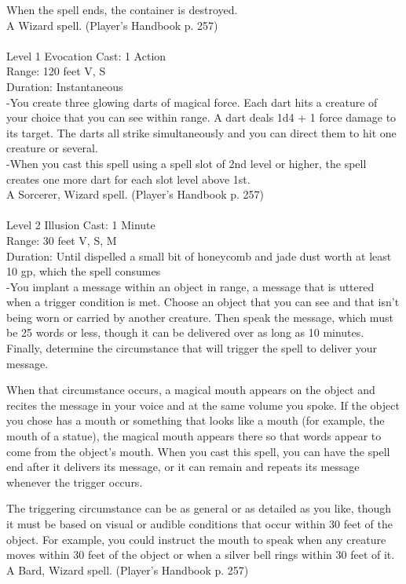 \documentclass[10pt,twocolumn]{report}
\begin{document}
When the spell ends, the container is destroyed.\\
A Wizard spell. (Player's Handbook p. 257) \\


 \\
Level 1 \quad Evocation \quad Cast: 1 Action\\
Range: 120 feet \quad V, S\\
Duration: Instantaneous \quad \\
-You create three glowing darts of magical force. Each dart hits a creature of your choice that you can see within range. A dart deals 1d4 + 1 force damage to its target. The darts all strike simultaneously and you can direct them to hit one creature or several.\\
-When you cast this spell using a spell slot of 2nd level or higher, the spell creates one more dart for each slot level above 1st.\\
A Sorcerer, Wizard spell. (Player's Handbook p. 257) \\


 \\
Level 2 \quad Illusion \quad Cast: 1 Minute\\
Range: 30 feet \quad V, S, M\\
Duration: Until dispelled \quad a small bit of honeycomb and jade dust worth at least 10 gp, which the spell consumes\\
-You implant a message within an object in range, a message that is uttered when a trigger condition is met.
Choose an object that you can see and that isn’t being worn or carried by another creature. Then speak the message, which must be 25 words or less, though it can be delivered over as long as 10 minutes. Finally, determine the circumstance that will trigger the spell to deliver your message.

When that circumstance occurs, a magical mouth appears on the object and recites the message in your voice and at the same volume you spoke. If the object you chose has a mouth or something that looks like a mouth (for example, the mouth of a statue), the magical mouth appears there so that words appear to come from the object’s mouth. When you cast this spell, you can have the spell end after it delivers its message, or it can remain and repeats its message whenever the trigger occurs.

The triggering circumstance can be as general or as detailed as you like, though it must be based on visual or audible conditions that occur within 30 feet of the object. For example, you could instruct the mouth to speak when any creature moves within 30 feet of the object or when a silver bell rings within 30 feet of it.\\
A Bard, Wizard spell. (Player's Handbook p. 257) \\
\end{document}
